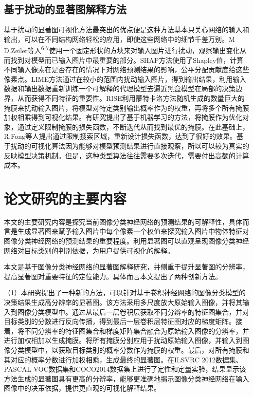 \subsection{基于扰动的显著图解释方法}
基于扰动的显著图可视化方法最突出的优点便是这种方法基本只关心网络的输入和输出，可以在不同结构网络轻松的应用，即使这些网络中的细节千差万别。M D.Zeiler等人\textsuperscript{\cite{zeiler2014visualizing}6-7}使用一个固定形状的方块来对输入图片进行扰动，观察输出变化从而找到对模型而已输入图片中最重要的部分。SHAP方法\textsuperscript{\cite{lundberg2017unified}}使用了Shapley值，计算不同输入像素在是否存在的情况下对网络预测结果的影响，公平分配贡献度给这些像素点。LIME\textsuperscript{\cite{ribeiro2016should}}方法通过在较小的范围内扰动输入图片，得到输出结果，利用输入数据和输出数据重新训练一个可解释的代理模型去逼近黑盒模型在局部的决策边界，从而获得不同特征的重要性。RISE\textsuperscript{\cite{petsiuk2018rise}}利用蒙特卡洛方法随机生成的数量巨大的掩膜来扰动输入图片，将模型对特定类别输出概率作为的权重，再将多个所有掩膜加权相乘得到可视化结果。有研究提出了基于机器学习的方法，将掩膜作为优化对象，通过定义限制掩膜的损失函数，不断迭代从而找到最优的掩膜。在此基础上，R.Fong等人\textsuperscript{\cite{fong2019understanding,fong2017interpretable}}提出通过限制搜索区域，重新设计损失函数，达到了很好的效果。基于扰动的可视化算法因为能够对模型预测结果进行直接观察，所以可以较为真实的反映模型决策机制。但是，这种类型算法往往需要多次迭代，需要付出高额的计算成本。

\section{论文研究的主要内容}
本文的主要研究内容是探究当前图像分类神经网络的预测结果的可解释性，具体而言是生成显著图来赋予输入图片中每个像素一个权值来探究输入图片中物体特征对图像分类神经网络的预测结果的重要程度。利用显著图可以直观呈现图像分类神经网络对目标类别的判别依据，为用户提供可视化的解释。  

本文是基于图像分类神经网络的显著图解释研究，并侧重于提升显著图的分辨率，提高显著图对重要特征的定位能力。具体而言本文提出了两种创新方法。

（1）本研究提出了一种新的方法，可以针对基于卷积神经网络的图像分类模型的决策结果生成高分辨率的显著图。该方法采用多尺度放大原始输入图像，并将其输入到图像分类模型中。通过从最后一层卷积层获取不同分辨率的特征图集合，并对目标类别的分数进行反向传播，得到最后一层卷积层特征图对应的梯度矩阵。接着，将不同分辨率的特征图集合和梯度矩阵集合融合为原始输入图像的分辨率，并进行加权相加以生成掩膜。将所有掩膜分别应用于扰动原始输入图像，并输入到图像分类模型中，以获取目标类别的概率分数作为掩膜的权重。最后，对所有掩膜和其对应的概率分数进行加权相乘，生成最终的显著图。在ILSVRC 2012数据集\textsuperscript{\cite{ILSVRC}}、PASCAL VOC数据集\textsuperscript{\cite{pascal}}和COCO2014数据集\textsuperscript{\cite{coco}}上进行了定性和定量实验，结果显示该方法生成的显著图具有更高的分辨率，能够更准确地揭示图像分类神经网络在输入图像中的决策依据，提供更直观的可视化解释结果。

